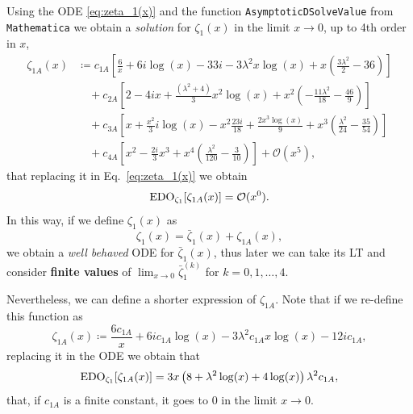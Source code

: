 \documentclass[%
 aip,
 jmp,%
 amsmath,amssymb,
 reprint,%
]{revtex4-2}
\begin{document}
Using the ODE \eqref{eq:zeta_1(x)} and the function \texttt{AsymptoticDSolveValue} from \texttt{Mathematica} we obtain a \textit{solution} for $\zeta_1(x)$ in the limit $x \to 0$, up to 4th order in $x$,
\begin{equation}
\begin{aligned}
    \zeta_{1A}(x) &\coloneq c_{1A} \left[\frac{6}{x} + 6 i \log (x) - 33 i - 3 \lambda ^2 x\log (x) + x \left(\frac{3 \lambda ^2}{2}-36\right)\right]\\
    &\quad + c_{2A} \left[2 - 4 i x + \frac{\left(\lambda ^2+4\right)}{3}x^2\log (x) + x^2 \left(-\frac{11 \lambda ^2}{18}-\frac{46}{9}\right) \right]\\
    &\quad + c_{3A} \left[x + \frac{x^2}{3} i \log (x) - x^2\frac{23 i}{18} + \frac{2x^3 \log (x)}{9} + x^3 \left(\frac{\lambda ^2}{24}-\frac{35}{54}\right)\right]\\
    &\quad +c_{4A} \left[x^2 - \frac{2 i}{3} x^3 + x^4\left(\frac{\lambda ^2}{120}-\frac{3}{10}\right)\right] + \mathcal{O}(x^5),
\end{aligned}
\end{equation}
that replacing it in Eq.~\eqref{eq:zeta_1(x)} we obtain
\begin{equation}
    \text{EDO}_{\zeta_1}\qty[\zeta_{1A}(x)] = \mathcal{O}(x^0).
\end{equation}
In this way, if we define $\zeta_1(x)$ as
\begin{equation}\label{eqAsymp:zeta_1(x)}
    \zeta_1(x) = \bar{\zeta}_1(x) + \zeta_{1A}(x),
\end{equation}
we obtain a \textit{well behaved} ODE for $\bar{\zeta}_1(x)$, thus later we can take its LT and consider \textbf{finite values} of $\lim_{x \to 0}\bar{\zeta}_1^{(k)}$ for $k=0,1,\dotso,4$.

Nevertheless, we can define a shorter expression of $\zeta_{1A}$. Note that if we re-define this function as
\begin{equation}
    \boxed{\zeta_{1A}(x) \coloneq \frac{6c_{1A}}{x} + 6ic_{1A}\log(x) - 3\lambda^2c_{1A}x\log(x) - 12ic_{1A},}
\end{equation}
replacing it in the ODE we obtain that
\begin{equation}
    \text{EDO}_{\zeta_1}\qty[\zeta_{1A}(x)] = 3x \left(8 + \lambda ^2 \log (x) + 4 \log (x)\right)\lambda^2 c_{1A},
\end{equation}
that, if $c_{1A}$ is a finite constant, it goes to $0$ in the limit $x \to 0$.
\end{document}
